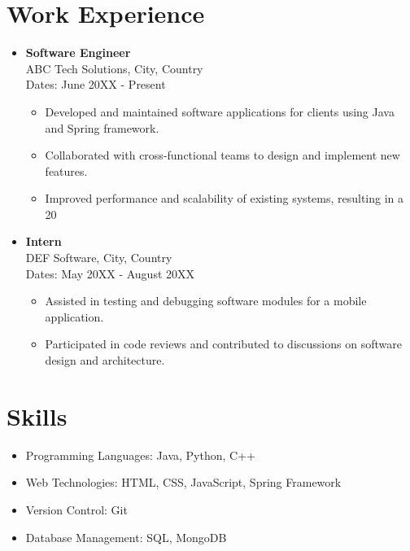 \documentclass[a4paper,10pt]{article}
\begin{document}
\section*{Work Experience}
\begin{itemize}[leftmargin=*]
    \item \textbf{Software Engineer} \\
    ABC Tech Solutions, City, Country \\
    Dates: June 20XX - Present
    \begin{itemize}
        \item Developed and maintained software applications for clients using Java and Spring framework.
        \item Collaborated with cross-functional teams to design and implement new features.
        \item Improved performance and scalability of existing systems, resulting in a 20%
    \end{itemize}
    
    \item \textbf{Intern} \\
    DEF Software, City, Country \\
    Dates: May 20XX - August 20XX
    \begin{itemize}
        \item Assisted in testing and debugging software modules for a mobile application.
        \item Participated in code reviews and contributed to discussions on software design and architecture.
    \end{itemize}
\end{itemize}

\section*{Skills}
\begin{itemize}[leftmargin=*]
    \item Programming Languages: Java, Python, C++
    \item Web Technologies: HTML, CSS, JavaScript, Spring Framework
    \item Version Control: Git
    \item Database Management: SQL, MongoDB
\end{itemize}
\end{document}
